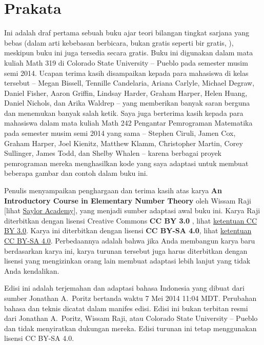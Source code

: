 \documentclass[12pt,letterpaper]{amsbook}
\theoremstyle{definition}
\theoremstyle{remark}
\numberwithin{figure}{section}
\numberwithin{exercise}{section}
\numberwithin{section}{chapter}
\numberwithin{equation}{section}
\numberwithin{table}{section}
\newenvironment{preface}{}{}
\begin{document}
\begin{preface}
\chapter*{Prakata}

Ini adalah draf pertama sebuah buku ajar teori bilangan tingkat sarjana yang
bebas (dalam arti kebebasan berbicara, bukan gratis seperti bir gratis,
\cite{stallman2002free}), meskipun buku ini juga tersedia secara gratis. Buku
ini digunakan dalam mata kuliah Math 319 di Colorado State University --
Pueblo pada semester musim semi 2014. Ucapan terima kasih disampaikan kepada
para mahasiswa di kelas tersebut -- Megan Bissell, Tennille Candelaria, Ariana
Carlyle, Michael Degraw, Daniel Fisher, Aaron Griffin, Lindsay Harder, Graham
Harper, Helen Huang, Daniel Nichols, dan Arika Waldrep -- yang memberikan banyak
saran berguna dan menemukan banyak salah ketik. Saya juga berterima kasih
kepada para mahasiswa dalam mata kuliah Math 242 Pengantar Pemrograman
Matematika pada semester musim semi 2014 yang sama -- Stephen Ciruli, Jamen
Cox, Graham Harper, Joel Kienitz, Matthew Klamm, Christopher Martin, Corey
Sullinger, James Todd, dan Shelby Whalen -- karena berbagai proyek pemrograman
mereka menghasilkan kode yang saya adaptasi untuk membuat beberapa gambar dan
contoh dalam buku ini.

Penulis menyampaikan penghargaan dan terima kasih atas karya {\bf An
Introductory Course in Elementary Number Theory} oleh Wissam Raji [lihat
  \href{https://www.saylor.org/books/}{Saylor Academy}], yang menjadi sumber
adaptasi awal buku ini. Karya
Raji diterbitkan dengan lisensi Creative Commons {\bf CC BY 3.0}
, lihat
  \href{https://creativecommons.org/licenses/by/3.0/}{ketentuan CC BY 3.0}.
Karya ini diterbitkan dengan lisensi
{\bf CC BY-SA 4.0}, lihat
  \href{https://creativecommons.org/licenses/by-sa/4.0/}{ketentuan CC BY-SA
4.0}. Perbedaannya adalah bahwa jika
Anda membangun karya baru berdasarkan karya ini, karya turunan tersebut juga
harus diterbitkan dengan lisensi yang mengizinkan orang lain membuat adaptasi
lebih lanjut yang tidak Anda kendalikan.

 Edisi ini adalah terjemahan dan
adaptasi bahasa Indonesia yang dibuat dari sumber Jonathan A.~Poritz bertanda
waktu 7 Mei 2014 11:04 MDT. Perubahan bahasa dan teknis dicatat dalam manifes
edisi. Edisi ini bukan terbitan resmi dari Jonathan A.~Poritz, Wissam Raji, atau
Colorado State University -- Pueblo dan tidak menyiratkan dukungan mereka.
Edisi turunan ini tetap menggunakan lisensi CC BY-SA 4.0.


\end{preface}
\end{document}
